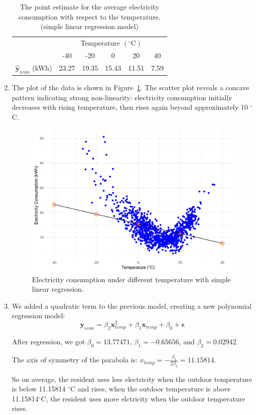 \documentclass[12pt]{article}
\begin{document}
\begin{enumerate}
\begin{table}[htpb]
	\centering
	\begin{tabular}{cccccc}
		\toprule
		\multirow{2}{*}{} &
		\multicolumn{5}{c}{Temperature $(^{\circ}\text{C})$}\\
		 & -40 & -20 & 0 & 20 & 40 \\
		\midrule
		$\hat{\mathbf{y}}_{econ}$ (kWh)&23.27&19.35&15.43&11.51&7.59\\
		\bottomrule
	\end{tabular}
	\caption{The point estimate for the average electricity consumption with respect to the temperature. (simple linear regression model)}
	\label{Tab:1}
\end{table}
\item The plot of the data is shown in Figure~\ref{Fig:1}.
The scatter plot reveals a concave pattern indicating strong non-linearity: electricity consumption initially decreases with rising temperature, then rises again beyond approximately 10 $^{\circ}$C.
\begin{figure}[htbp]
\includegraphics[width=.7\textwidth]{1.png}
\centering
\caption{Electricity consumption under different temperature with simple linear regression.}
\label{Fig:1}
\end{figure}
\item We added a quadratic term to the previous model, creating a new polynomial regression model:
\[
\mathbf{y}_{econ} = \beta_2 \mathbf{x}_{temp}^{2}
+\beta_1 \mathbf{x}_{temp} + \beta_0 + \mathbf{\epsilon}
\] 

After regression, we got $\beta_0 = 13.77471$, $\beta_1 = -0.65656$, and $\beta_2 = 0.02942$.

The axis of symmetry of the parabola is: $x_{temp} =  -\frac{\beta_1}{2\beta_2} = 11.15814$.

So on average, the resident uses less electricity when the outdoor temperature is below 11.15814 $^{\circ}$C and rises, when the outdoor temperature is above 11.15814$^{\circ}$C, the resident uses more elctricity when the outdoor temperature rises.


\end{enumerate}
\end{document}
